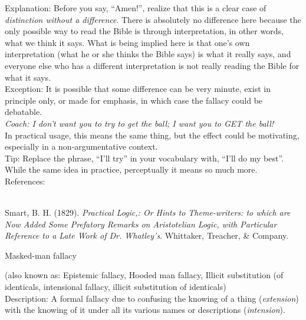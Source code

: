 \documentclass[a4paper,12pt,single,pdftex]{scrbook}
\begin{document}
{    
      Explanation: Before you say, “Amen!”, realize that this is a clear case of {\it distinction without a difference}.  There is absolutely no difference here because the only possible way to read the Bible is through interpretation, in other words, what we think it says.  What is being implied here is that one's own interpretation (what he or she thinks the Bible says) is what it really says, and everyone else who has a different interpretation is not really reading the Bible for what it says.
    \\

    
      Exception: It is possible that some difference can be very minute, exist in principle only, or made for emphasis, in which case the fallacy could be debatable.
    \\

    
      {\em Coach:  I don’t want you to try to get the ball; I want you to GET the ball!}
    \\

    
      In practical usage, this means the same thing, but the effect could be motivating, especially in a non-argumentative context.
    \\

    
      Tip: Replace the phrase, “I’ll try” in your vocabulary with, “I’ll do my best”.  While the same idea in practice, perceptually it means so much more.
    \\

    References:

    
      
        
      \\

      
        
          Smart, B. H. (1829). {\it Practical Logic,: Or Hints to Theme-writers: to which are Now Added Some Prefatory Remarks on Aristotelian Logic, with Particular Reference to a Late Work of Dr. Whatley’s}. Whittaker, Treacher, \& Company.
        
      
    
  }


Masked-man fallacy
    
      (also known as: Epistemic fallacy, Hooded man fallacy, Illicit substitution (of identicals, intensional fallacy, illicit substitution of identicals)
    \\

  
    Description: A formal fallacy due to confusing the knowing of a thing ({\it extension}) with the knowing of it under all its various names or descriptions ({\it intension}).
\end{document}
